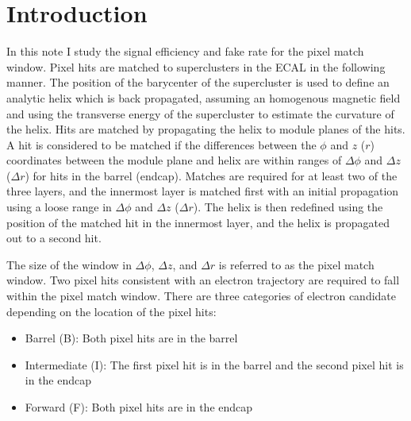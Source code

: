 \section{Introduction}

In this note I study the signal efficiency and fake rate for the pixel match window.  Pixel hits are matched to superclusters in the ECAL in the following manner.  The position of the barycenter of the supercluster is used to define an analytic helix which is back propagated, assuming an homogenous magnetic field and using the transverse energy of the supercluster to estimate the curvature of the helix.  Hits are matched by propagating the helix to module planes of the hits.  A hit is considered to be matched if the differences between the $\phi$ and $z$ ($r$) coordinates between the module plane and helix are within ranges of $\Delta\phi$ and $\Delta z$ ($\Delta r$) for hits in the barrel (endcap).  Matches are required for at least two of the three layers, and the innermost layer is matched first with an initial propagation using a loose range in $\Delta\phi$ and $\Delta z$ ($\Delta r$).  The helix is then redefined using the position of the matched hit in the innermost layer, and the helix is propagated out to a second hit.

The size of the window in $\Delta\phi$, $\Delta z$, and $\Delta r$ is referred to as the pixel match window.  Two pixel hits consistent with an electron trajectory are required to fall within the pixel match window.  There are three categories of electron candidate depending on the location of the pixel hits:
\begin{itemize}
  \item Barrel (B): Both pixel hits are in the barrel
  \item Intermediate (I): The first pixel hit is in the barrel and the second pixel hit is in the endcap
  \item Forward (F): Both pixel hits are in the endcap
  
\end{itemize}

